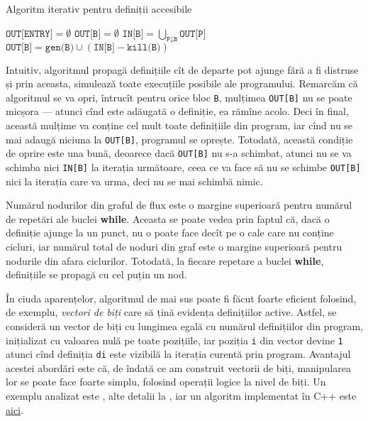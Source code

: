 \begin{algorithm}
    \caption{Algoritm iterativ pentru definiții accesibile}
    \begin{algorithmic}[1]
            \State $ \texttt{OUT[ENTRY]} = \emptyset $
                \State $ \texttt{OUT[B]} = \emptyset $
            \EndFor
                    \State $ \texttt{IN[B]} = \bigcup_{\texttt{P} \downarrow \texttt{B}} \texttt{OUT[P]} $
                    \State $ \texttt{OUT[B]} = \texttt{gen(B)} \cup (\texttt{IN[B]} - \texttt{kill(B)}) $
                \EndFor
            \EndWhile
        \EndProcedure
    \end{algorithmic}
    \label{alg:rdef}
\end{algorithm}


Intuitiv, algoritmul propagă definițiile cît de departe pot ajunge fără a fi
distruse și prin aceasta, simulează toate execuțiile posibile ale programului.
Remarcăm că algoritmul se va opri, întrucît pentru orice bloc \texttt{B},
mulțimea \texttt{OUT[B]} nu se poate micșora --- atunci cînd este adăugată
o definiție, ea rămîne acolo. Deci în final, această mulțime va conține
cel mult toate definițiile din program, iar cînd nu se mai adaugă niciuna
la \texttt{OUT[B]}, programul se oprește. Totodată, această condiție de
oprire este una bună, deoarece dacă \texttt{OUT[B]} nu s-a schimbat,
atunci nu se va schimba nici \texttt{IN[B]} la iterația următoare,
ceea ce va face să nu se schimbe \texttt{OUT[B]} nici la iterația care
va urma, deci nu se mai schimbă nimic.

Numărul nodurilor din graful de flux este o margine superioară pentru numărul
de repetări ale buclei \textbf{while}. Aceasta se poate vedea prin faptul
că, dacă o definiție ajunge la un punct, nu o poate face decît pe o cale
care nu conține cicluri, iar numărul total de noduri din graf este o margine
superioară pentru nodurile din afara ciclurilor. Totodată, la fiecare
repetare a buclei \textbf{while}, definițiile se propagă cu cel puțin un
nod.

În ciuda aparențelor, algoritmul de mai sus poate fi făcut foarte eficient
folosind, de exemplu, \emph{vectori de biți} care să țină evidența
definițiilor active. Astfel, se consideră un vector de biți cu lungimea
egală cu numărul definițiilor din program, inițializat cu valoarea nulă
pe toate pozițiile, iar poziția \texttt{i} din vector devine \texttt{1}
atunci cînd definiția \texttt{di} este vizibilă la iterația curentă
prin program. Avantajul acestei abordări este că, de îndată ce am construit
vectorii de biți, manipularea lor se poate face foarte simplu, folosind
operații logice la nivel de biți. Un exemplu analizat este 
\cite[Example 9.12, p.~607]{aho}, alte detalii la \cite[\S 8.1]{much}, 
iar un algoritm implementat în C++ este 
\href{https://github.com/bhumbers/optcomp/blob/master/asst2/ClassicalDataflow/reaching-definitions.cpp}{aici}.

